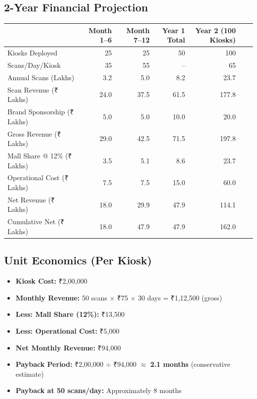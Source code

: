 \documentclass[12pt,a4paper]{article}
\begin{document}
\subsection{2-Year Financial Projection}

\begin{tabular}{lrrrrrr}
\toprule
 & \textbf{Month 1--6} & \textbf{Month 7--12} & \textbf{Year 1 Total} & \textbf{Year 2 (100 Kiosks)} \\
\midrule
Kiosks Deployed & 25 & 25 & 50 & 100 \\
Scans/Day/Kiosk & 35 & 55 & -- & 65 \\
Annual Scans (Lakhs) & 3.2 & 5.0 & 8.2 & 23.7 \\
Scan Revenue (₹ Lakhs) & 24.0 & 37.5 & 61.5 & 177.8 \\
Brand Sponsorship (₹ Lakhs) & 5.0 & 5.0 & 10.0 & 20.0 \\
Gross Revenue (₹ Lakhs) & 29.0 & 42.5 & 71.5 & 197.8 \\
Mall Share @ 12\% (₹ Lakhs) & 3.5 & 5.1 & 8.6 & 23.7 \\
Operational Cost (₹ Lakhs) & 7.5 & 7.5 & 15.0 & 60.0 \\
Net Revenue (₹ Lakhs) & 18.0 & 29.9 & 47.9 & 114.1 \\
\midrule
Cumulative Net (₹ Lakhs) & 18.0 & 47.9 & 47.9 & 162.0 \\
\bottomrule
\end{tabular}

\subsection{Unit Economics (Per Kiosk)}

\begin{itemize}
    \item \textbf{Kiosk Cost:} ₹2,00,000
    \item \textbf{Monthly Revenue:} 50 scans $\times$ ₹75 $\times$ 30 days = ₹1,12,500 (gross)
    \item \textbf{Less: Mall Share (12\%):} ₹13,500
    \item \textbf{Less: Operational Cost:} ₹5,000
    \item \textbf{Net Monthly Revenue:} ₹94,000
    \item \textbf{Payback Period:} ₹2,00,000 $\div$ ₹94,000 $\approx$ \textbf{2.1 months} (conservative estimate)
    \item \textbf{Payback at 50 scans/day:} Approximately 8 months
\end{itemize}
\end{document}
